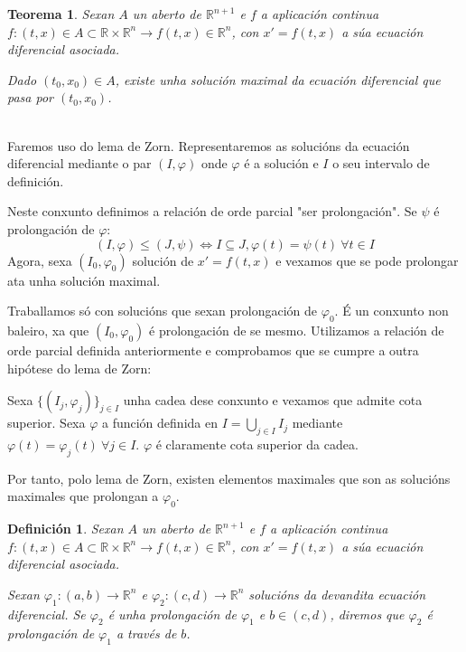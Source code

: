 \documentclass[11pt, a4paper,twoside]{article}
\makeatletter
\newcommand{\iindex}[1]{\emph{#1}\index{#1}}
\theoremstyle{theorem-style}  %
\newtheorem{theorem}{Teorema}[section]  %
\renewenvironment{proof}[1][\proofname]{\par
	\pushQED{\qed}%
	\normalfont \topsep6\p@\@plus6\p@\relax
	\list{}{%
		\settowidth{\leftmargin}{\quad:\hskip\labelsep}%
		\setlength{\labelwidth}{0pt}%
		\setlength{\itemindent}{-\leftmargin}%
	}%
	\item[\hskip\labelsep\itshape#1\@addpunct{:}]\ignorespaces
}{%
	\popQED\endlist\@endpefalse
}
\theoremstyle{definition-style}
\newtheorem{definition}{Definición}[section]
\theoremstyle{example-style}
\makeatother
\begin{document}
\begin{theorem}
	Sexan $ A $ un aberto de $ \mathbb{R}^{n+1} $ e $ f $ a aplicación continua $ f:(t,x)\in A\subset \mathbb{R}\times \mathbb{R}^n \longrightarrow f(t,x)\in \mathbb{R}^n $, con $  x'=f(t,x) $ a súa ecuación diferencial asociada. 
	
	Dado $ (t_0,x_0)\in A $, existe unha solución maximal da ecuación diferencial que pasa por $ (t_0,x_0) $.
	
\end{theorem}
\begin{proof} \ \\	
	Faremos uso do lema de Zorn. Representaremos as solucións da ecuación diferencial mediante o par $ (I,\varphi) $ onde $ \varphi $ é a solución e $ I $ o seu intervalo de definición.
	
	Neste conxunto definimos a relación de orde parcial "ser prolongación". Se $ \psi $ é prolongación de $ \varphi $:
	\[ (I,\varphi)\leq (J,\psi)\Leftrightarrow I\subseteq J, \varphi(t)=\psi(t) \ \forall t \in I \]
	Agora, sexa $ (I_0,\varphi_0) $ solución de $ x'=f(t,x) $ e vexamos que se pode prolongar ata unha solución maximal.
	
	Traballamos só con solucións que sexan prolongación de $ \varphi_0 $. É un conxunto non baleiro, xa que $ (I_0,\varphi_0) $ é prolongación de se mesmo. Utilizamos a relación de orde parcial definida anteriormente e comprobamos que se cumpre a outra hipótese do lema de Zorn:
	
	Sexa $ \{(I_j,\varphi_j) \}_{j\in I} $ unha cadea dese conxunto e vexamos que admite cota superior. Sexa $ \varphi $ a función definida en $ I=\bigcup_{j\in I}I_j $ mediante $ \varphi(t)=\varphi_j(t) \ \forall j \in I $. $ \varphi $ é claramente cota superior da cadea.
	
	Por tanto, polo lema de Zorn, existen elementos maximales que son as solucións maximales que prolongan a $ \varphi_0 $.	
\end{proof}
\begin{definition}
	Sexan $ A $ un aberto de $ \mathbb{R}^{n+1} $ e $ f $ a aplicación continua $ f:(t,x)\in A\subset \mathbb{R}\times \mathbb{R}^n \longrightarrow f(t,x)\in \mathbb{R}^n $, con $  x'=f(t,x) $ a súa ecuación diferencial asociada. 
	
	Sexan $ \varphi_1:(a,b)\longrightarrow \mathbb{R}^n $ e $ \varphi_2:(c,d)\longrightarrow \mathbb{R}^n $ solucións da devandita ecuación diferencial. Se $ \varphi_2 $ é unha prolongación de $ \varphi_1 $ e $ b\in(c,d) $, diremos que $ \varphi_2 $ é \iindex{prolongación de $ \varphi_1 $ a través de $ b $}.
\end{definition}
\end{document}
